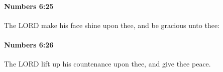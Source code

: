 		\paragraph{Numbers 6:25} %
			\label{NUMBERS-6-25}

			The LORD make his face shine upon thee, and be gracious unto thee:


		\paragraph{Numbers 6:26} %
			\label{NUMBERS-6-26}

			The LORD lift up his countenance upon thee, and give thee peace.


